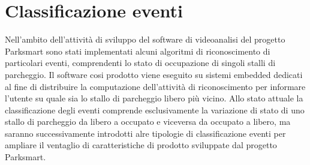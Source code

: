 \section{Classificazione eventi}
Nell'ambito dell'attività di sviluppo del software di videoanalisi del progetto Parksmart sono stati implementati alcuni algoritmi di riconoscimento di particolari eventi, comprendenti lo stato di occupazione di singoli stalli di parcheggio. Il software cosi prodotto viene eseguito su sistemi embedded dedicati al fine di distribuire la computazione dell'attività di riconoscimento per informare l'utente su quale sia lo stallo di parcheggio libero più vicino. Allo stato attuale la classificazione degli eventi comprende esclusivamente la variazione di stato di uno stallo di parcheggio da libero a occupato e viceversa da occupato a libero, ma saranno successivamente introdotti alre tipologie di classificazione eventi per ampliare il ventaglio di caratteristiche di prodotto sviluppate dal progetto Parksmart.